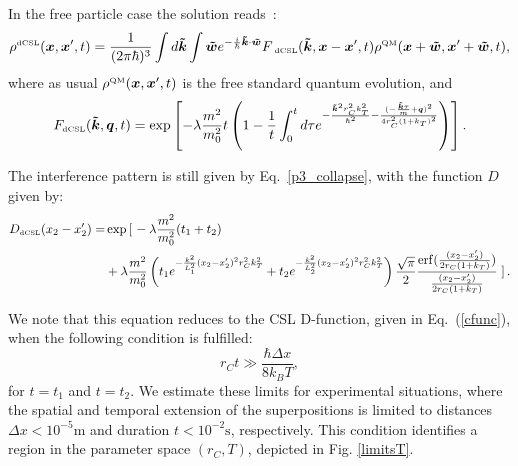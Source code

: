 \documentclass[12pt,groupedaddress,pra,aps]{revtex4-1}
\DeclareMathOperator\erf{erf}
\begin{document}
In the free particle case the solution reads~\cite{Smirne:2014paa}:
\begin{equation}\label{rho_grw_dcsl}
\rho^{\text{\tiny dCSL}}(\bm{x},\bm{x}',t)= \frac{1}{(2\pi\hbar)^3} \int d\bm{\tilde{k}}  \int \bm{\tilde{w}} e^{-\frac{i}{\hbar}\bm{\tilde{k}} \cdot \bm{\tilde{w}}} F_{\text{ \tiny dCSL}}(\bm{\tilde{k}},\bm{x}-\bm{x}',t) \rho^{\text{\tiny QM}}(\bm{x}+\bm{\tilde{w}},\bm{x}'+\bm{\tilde{w}},t),
\end{equation}
where as usual $\rho^{\text{\tiny QM}}(\bm{x},\bm{x}',t)$ is the free standard quantum evolution, and
\begin{equation}\label{FF_dcsl}
F_{\text{\tiny dCSL}}(\bm{\tilde{k}},\bm{q},t)=  \exp\left[ -\lambda \frac{m^2}{m_0^2} t  \left(1-\frac{1}{t}\int_0^t d\tau e^{-\frac{\bm{\tilde{k}}^2r_C^2 k_T^2 }{\hbar^2} -\frac{(-\frac{\bm{\tilde{k}}\tau}{m}+\bm{q})^2}{4r_C^2 (1+k_T)^2} } \right) \right].
\end{equation}

The interference pattern is still given by Eq.~\eqref{p3_collapse}, with the function $D$ given by:
\begin{equation}\label{cfunc_dcsl}
\begin{split}
D_{\text{\tiny dCSL}}(x_2-x_2')= &\exp \left[\right. -\lambda \frac{m^2}{m_0^2} (t_1+t_2) \\
&+ \lambda \frac{m^2}{m_0^2} \left( t_1 e^{-\frac{k^2}{L_1^2}(x_2-x'_2)^2 r_C^2 k_T^2}+t_2 e^{-\frac{k^2}{L_2^2}(x_2-x'_2)^2 r_C^2 k_T^2 }\right) 
\frac{\sqrt{\pi}}{2}\frac{\erf (\frac{(x_2-x_2')}{2 r_C(1+k_T)})}{\frac{(x_2-x_2')}{2r_C(1 +k_T)}} \left.\right].
\end{split}
\end{equation}

We note that this equation reduces to the CSL D-function, given in
Eq.~(\ref{cfunc}), when the following condition is fulfilled:
\begin{equation}
r_{C}t \gg \frac{\hbar\Delta x}{8k_{B}T},\label{eq:dcsl_cond1}
\end{equation}
for $t=t_{1}$ and $t=t_{2}$. 
We estimate these limits for experimental situations, where the spatial and temporal extension of the superpositions is limited to distances $\Delta x<10^{-5}\text{m}$
and duration $t<10^{-2}\text{s}$, respectively. This condition identifies a region in the parameter space $(r_{C},T)$, depicted in Fig. \ref{limitsT}.
\end{document}

